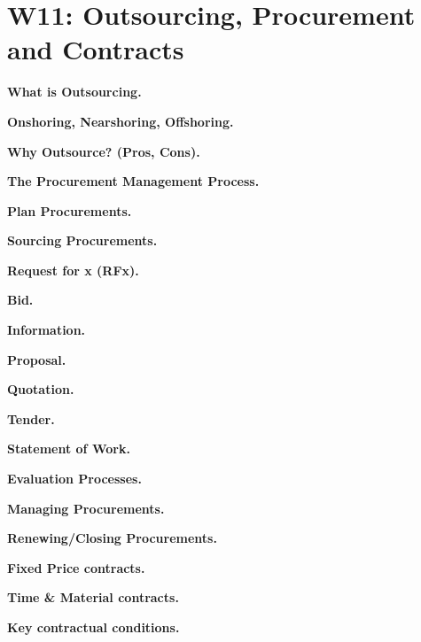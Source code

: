 \section{W11: Outsourcing, Procurement and Contracts}

\textbf{What is Outsourcing.}

\textbf{Onshoring, Nearshoring, Offshoring.}

\textbf{Why Outsource? (Pros, Cons).}

\textbf{The Procurement Management Process.}

    \textbf{Plan Procurements.}

    \textbf{Sourcing Procurements.}

        \textbf{Request for x (RFx).}

            \textbf{Bid.}

            \textbf{Information.}

            \textbf{Proposal.}

            \textbf{Quotation.}

            \textbf{Tender.}

        \textbf{Statement of Work.}

        \textbf{Evaluation Processes.}

    \textbf{Managing Procurements.}

        \textbf{Renewing/Closing Procurements.}

\textbf{Fixed Price contracts.}

\textbf{Time \& Material contracts.}

\textbf{Key contractual conditions.}
